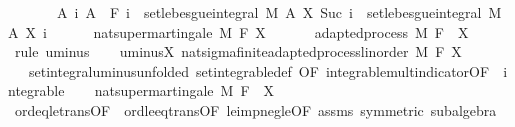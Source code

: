 \begin{isabellebody}
\ \ \ \ \ \ \ {\isachardoublequoteopen}{\isasymAnd}A\ i{\isachardot}{\kern0pt}\ A\ {\isasymin}\ F\ i\ {\isasymLongrightarrow}\ set{\isacharunderscore}{\kern0pt}lebesgue{\isacharunderscore}{\kern0pt}integral\ M\ A\ {\isacharparenleft}{\kern0pt}X\ {\isacharparenleft}{\kern0pt}Suc\ i{\isacharparenright}{\kern0pt}{\isacharparenright}{\kern0pt}\ {\isasymle}\ set{\isacharunderscore}{\kern0pt}lebesgue{\isacharunderscore}{\kern0pt}integral\ M\ A\ {\isacharparenleft}{\kern0pt}X\ i{\isacharparenright}{\kern0pt}{\isachardoublequoteclose}\ \isanewline
\ \ \ \ \ {\isachardoublequoteopen}nat{\isacharunderscore}{\kern0pt}supermartingale\ M\ F\ X{\isachardoublequoteclose}\isanewline
%
\isadelimproof
%
\endisadelimproof
%
\isatagproof
{}\isamarkupfalse%
\ {\isacharminus}{\kern0pt}\isanewline
\ \ \isamarkupfalse%
\ {\isacharunderscore}{\kern0pt}{\isacharcolon}{\kern0pt}\ adapted{\isacharunderscore}{\kern0pt}process\ M\ F\ {}\ {\isachardoublequoteopen}{\isacharminus}{\kern0pt}X{\isachardoublequoteclose}\ \isamarkupfalse%
\ {\isacharparenleft}{\kern0pt}rule\ uminus{\isacharparenright}{\kern0pt}\isanewline
\ \ \isamarkupfalse%
\ uminus{\isacharunderscore}{\kern0pt}X{\isacharcolon}{\kern0pt}\ nat{\isacharunderscore}{\kern0pt}sigma{\isacharunderscore}{\kern0pt}finite{\isacharunderscore}{\kern0pt}adapted{\isacharunderscore}{\kern0pt}process{\isacharunderscore}{\kern0pt}linorder\ M\ F\ {\isachardoublequoteopen}{\isacharminus}{\kern0pt}X{\isachardoublequoteclose}\ \isacommand{{\isachardot}{\kern0pt}{\isachardot}{\kern0pt}}\isamarkupfalse%
\isanewline
\ \ \isamarkupfalse%
\ {\isacharasterisk}{\kern0pt}\ {\isacharequal}{\kern0pt}\ set{\isacharunderscore}{\kern0pt}integral{\isacharunderscore}{\kern0pt}uminus{\isacharbrackleft}{\kern0pt}unfolded\ set{\isacharunderscore}{\kern0pt}integrable{\isacharunderscore}{\kern0pt}def{\isacharcomma}{\kern0pt}\ OF\ integrable{\isacharunderscore}{\kern0pt}mult{\isacharunderscore}{\kern0pt}indicator{\isacharbrackleft}{\kern0pt}OF\ {\isacharunderscore}{\kern0pt}\ integrable{\isacharbrackright}{\kern0pt}{\isacharbrackright}{\kern0pt}\isanewline
\ \ \isamarkupfalse%
\ {\isachardoublequoteopen}nat{\isacharunderscore}{\kern0pt}supermartingale\ M\ F\ {\isacharparenleft}{\kern0pt}{\isacharminus}{\kern0pt}{\isacharparenleft}{\kern0pt}{\isacharminus}{\kern0pt}\ X{\isacharparenright}{\kern0pt}{\isacharparenright}{\kern0pt}{\isachardoublequoteclose}\ \isanewline
\ \ \ \ \isamarkupfalse%
\ ord{\isacharunderscore}{\kern0pt}eq{\isacharunderscore}{\kern0pt}le{\isacharunderscore}{\kern0pt}trans{\isacharbrackleft}{\kern0pt}OF\ {\isacharasterisk}{\kern0pt}\ ord{\isacharunderscore}{\kern0pt}le{\isacharunderscore}{\kern0pt}eq{\isacharunderscore}{\kern0pt}trans{\isacharbrackleft}{\kern0pt}OF\ le{\isacharunderscore}{\kern0pt}imp{\isacharunderscore}{\kern0pt}neg{\isacharunderscore}{\kern0pt}le{\isacharbrackleft}{\kern0pt}OF\ assms{\isacharparenleft}{\kern0pt}{}{\isacharparenright}{\kern0pt}{\isacharbrackright}{\kern0pt}\ {\isacharasterisk}{\kern0pt}{\isacharbrackleft}{\kern0pt}symmetric{\isacharbrackright}{\kern0pt}{\isacharbrackright}{\kern0pt}{\isacharbrackright}{\kern0pt}\ subalgebra\isanewline

\end{isabellebody}
